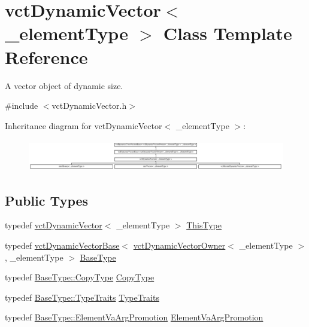 \hypertarget{classvct_dynamic_vector}{}\section{vct\+Dynamic\+Vector$<$ \+\_\+element\+Type $>$ Class Template Reference}
\label{classvct_dynamic_vector}


A vector object of dynamic size.  




{\ttfamily \#include $<$vct\+Dynamic\+Vector.\+h$>$}

Inheritance diagram for vct\+Dynamic\+Vector$<$ \+\_\+element\+Type $>$\+:\begin{figure}[H]
\begin{center}
\leavevmode
\includegraphics[height=1.385281cm]{d8/d36/classvct_dynamic_vector}
\end{center}
\end{figure}
\subsection*{Public Types}
\begin{DoxyCompactItemize}
\item 
typedef \hyperlink{classvct_dynamic_vector}{vct\+Dynamic\+Vector}$<$ \+\_\+element\+Type $>$ \hyperlink{classvct_dynamic_vector_a35327e01975af9fc9db8d93a4a27370f}{This\+Type}
\item 
typedef \hyperlink{classvct_dynamic_vector_base}{vct\+Dynamic\+Vector\+Base}$<$ \hyperlink{classvct_dynamic_vector_owner}{vct\+Dynamic\+Vector\+Owner}$<$ \+\_\+element\+Type $>$, \+\_\+element\+Type $>$ \hyperlink{classvct_dynamic_vector_aab0ea4a1ec16f7694beb39869ab780bf}{Base\+Type}
\item 
typedef \hyperlink{classvct_dynamic_vector_base_a62fcc6341849207c5273566d0bce3cf5}{Base\+Type\+::\+Copy\+Type} \hyperlink{classvct_dynamic_vector_a924a58839df36234b070c7d06f875079}{Copy\+Type}
\item 
typedef \hyperlink{classvct_dynamic_vector_base_ae5ebb885e67454fa18cb8101f1acc8dd}{Base\+Type\+::\+Type\+Traits} \hyperlink{classvct_dynamic_vector_ad0c3e6e940b18c5c1d014aac726ad7de}{Type\+Traits}
\item 
typedef \hyperlink{classvct_dynamic_vector_base_a74f36531adfd7ec68ac6500176134156}{Base\+Type\+::\+Element\+Va\+Arg\+Promotion} \hyperlink{classvct_dynamic_vector_a7f290da80b23d4dd6bcc61d7db77aa75}{Element\+Va\+Arg\+Promotion}
\end{DoxyCompactItemize}
